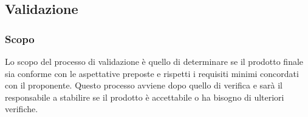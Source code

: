 \subsection{Validazione}
\subsubsection{Scopo} 
Lo scopo del processo di validazione è quello di determinare se il prodotto finale sia 
conforme con le aspettative preposte e rispetti i requisiti minimi concordati con il 
proponente. Questo processo avviene dopo quello di verifica e sarà il responsabile a 
stabilire se il prodotto è accettabile o ha bisogno di ulteriori verifiche.